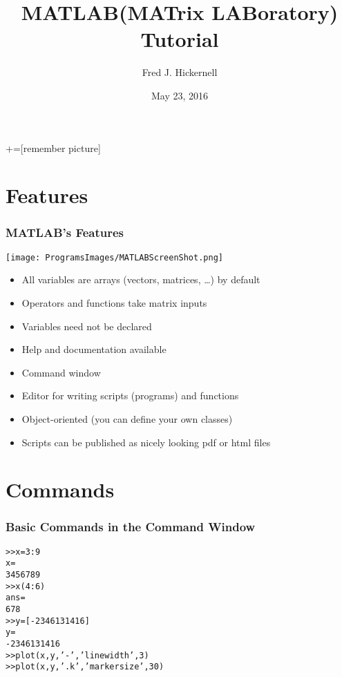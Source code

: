 \documentclass[12pt, compress,xcolor={usenames,dvipsnames}]{beamer} %
\newcommand{\Matlab}{MATLAB\xspace}
\begin{document}
	+=[remember picture]
	\everymath{\displaystyle}
	
	\title[Illinois Institute of Technology]{\Matlab (MATrix LABoratory) Tutorial}
	\author[Fred J. Hickernell]{Fred J. Hickernell}
	\date[May 23, 2016]{May 23, 2016}
	\frame[label=title]{\titlepage}
	
	\section{Features}
	\begin{frame}\frametitle{\Matlab's Features}
		
		\centerline{\texttt{[image: ProgramsImages/MATLABScreenShot.png]}}
		\begin{itemize}
						
			\item All variables are arrays (vectors, matrices, \ldots) by default
			
			\item Operators and functions take matrix inputs
			
			\item Variables need not be declared
			
			\item Help and documentation available
			
			\item Command window
			
			\item Editor for writing scripts (programs) and functions
			
			\item Object-oriented (you can define your own classes)
			
			\item Scripts can be published as nicely looking pdf or html files
			
		\end{itemize}
		
	\end{frame}

\section{Commands}
	
\begin{frame}[fragile]\frametitle{Basic Commands in the Command Window}
\begin{alltt}
>> x = 3:9 %set x to be a vector of inputs
x =
     3     4     5     6     7     8     9
>> x(4:6) %display the 4th through 6th elements
ans =
    6     7     8
>> y = [-2 3 4 6 13 14 16] %a vector of outputs
y =
    -2     3     4     6    13    14    16
>> plot(x,y,'-','linewidth',3) %connected by line segments
>> plot(x,y,'.k','markersize',30) %plot points as dots
\end{alltt}
\end{frame}
\end{document}

